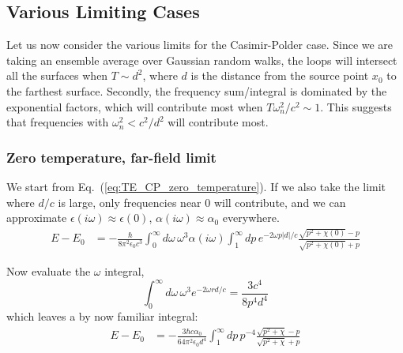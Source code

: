 \subsection{Various Limiting Cases}

Let us now consider the various limits for the Casimir-Polder case.
  Since we are taking an ensemble average over Gaussian random walks,
 the loops will intersect all the surfaces when $T\sim d^2$, 
where $d$ is the distance from the source point $x_0$ to the farthest surface.
  Secondly, the frequency sum/integral is dominated by the exponential factors,
 which will contribute most when $T\omega_n^2/c^2\sim 1$.
  This suggests that frequencies with  $\omega_n^2< c^2/d^2$  will contribute most.   

\subsubsection{Zero temperature, far-field limit}

We start from Eq.~(\ref{eq:TE_CP_zero_temperature}).
  If we also take the limit where $d/c$ is large, only frequencies near $0$ will contribute,
 and we can approximate $\epsilon(i\omega) \approx \epsilon(0)$, $\alpha(i\omega)\approx\alpha_0$ everywhere.  
\begin{align}
E-E_0&=-\frac{\hbar}{8\pi^2\epsilon_0c^3}\int_0^\infty d\omega\,\omega^3\alpha(i\omega)
\int_1^\infty dp\,e^{-2\omega p|d|/c}\frac{\sqrt{p^2+\chi(0)}-p}{\sqrt{p^2+\chi(0)}+p}
\end{align}

 Now evaluate the $\omega$ integral, 
\begin{equation}
\int_{0}^\infty d\omega\,\omega^3e^{-2\omega r d/c} = \frac{3 c^4}{8 p^4 d^4}
\end{equation}
which leaves a by now familiar integral:
\begin{align}
E-E_0&= -\frac{3\hbar c\alpha_0}{64\pi^2 \epsilon_0 d^4}\int_1^\infty dp\,p^{-4}\frac{\sqrt{p^2+\chi}-p}{\sqrt{p^2+\chi}+p}
\end{align}


